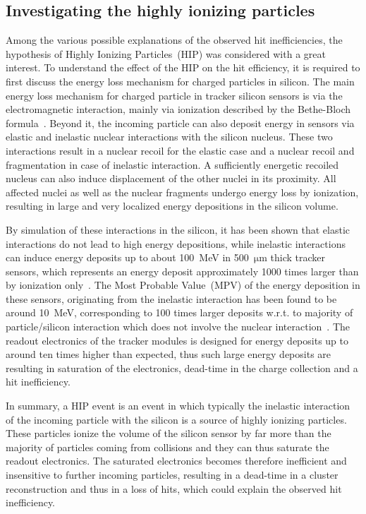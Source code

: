 

\subsection{Investigating the highly ionizing particles}

Among the various possible explanations of the observed hit inefficiencies, the hypothesis of Highly Ionizing Particles~(HIP) was considered with a great interest. To understand the effect of the HIP on the hit efficiency, it is required to first discuss the energy loss mechanism for charged particles in silicon. The main energy loss mechanism for charged particle in tracker silicon sensors is via the electromagnetic interaction, mainly via ionization described by the Bethe-Bloch formula~\cite{Groom:2000sm}. Beyond it, the incoming particle can also deposit energy in sensors via elastic and inelastic nuclear interactions with the silicon nucleus. These two interactions result in a nuclear recoil for the elastic case and a nuclear recoil and fragmentation in case of inelastic interaction. A sufficiently energetic recoiled nucleus can also induce displacement of the other nuclei in its proximity. All affected nuclei as well as the nuclear fragments undergo energy loss by ionization, resulting in large and very localized energy depositions in the silicon volume. 

By simulation of these interactions in the silicon, it has been shown that elastic interactions do not lead to high energy depositions, while inelastic interactions can induce energy deposits up to about 100~MeV in 500~$\mathrm{\mu m}$ thick tracker sensors, which represents an energy deposit approximately 1000 times larger than by ionization only~\cite{Huhtinen:2002yda}. The Most Probable Value~(MPV) of the energy deposition in these sensors, originating from the inelastic interaction has been found to be around 10~MeV, corresponding to 100 times larger deposits w.r.t. to majority of particle/silicon interaction which does not involve the nuclear interaction~\cite{Adam:2005pz}. The readout electronics of the tracker modules is designed for energy deposits up to around ten times higher than expected, thus such large energy deposits are resulting in saturation of the electronics, dead-time in the charge collection and a hit inefficiency. 

In summary, a HIP event is an event in which typically the inelastic interaction of the incoming particle with the silicon is a source of highly ionizing particles. These particles ionize the volume of the silicon sensor by far more than the majority of particles coming from collisions and they can thus saturate the readout electronics. The saturated electronics becomes therefore inefficient and insensitive to further incoming particles, resulting in a dead-time in a cluster reconstruction and thus in a loss of hits, which could explain the observed hit inefficiency.

